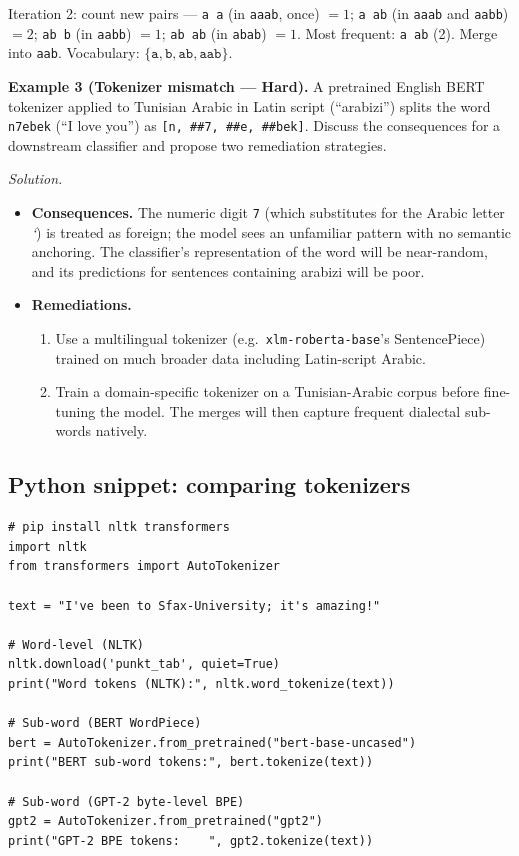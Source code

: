 \documentclass[12pt,a4paper]{report}
\theoremstyle{definition}
\theoremstyle{remark}
\begin{document}
Iteration 2: count new pairs --- \texttt{a\,a} (in \texttt{aaab}, once) $= 1$; \texttt{a\,ab} (in \texttt{aaab} and \texttt{aabb}) $= 2$; \texttt{ab\,b} (in \texttt{aabb}) $= 1$; \texttt{ab\,ab} (in \texttt{abab}) $= 1$.
Most frequent: \texttt{a\,ab} (2). Merge into \texttt{aab}. Vocabulary: $\{\texttt{a}, \texttt{b}, \texttt{ab}, \texttt{aab}\}$.

\medskip

\textbf{Example 3 (Tokenizer mismatch --- Hard).}
A pretrained English BERT tokenizer applied to Tunisian Arabic in Latin script (``arabizi'') splits the word \texttt{n7ebek} (``I love you'') as \texttt{[n, \#\#7, \#\#e, \#\#bek]}. Discuss the consequences for a downstream classifier and propose two remediation strategies.

\textit{Solution.}
\begin{itemize}
    \item \textbf{Consequences.} The numeric digit \texttt{7} (which substitutes for the Arabic letter \emph{`}) is treated as foreign; the model sees an unfamiliar pattern with no semantic anchoring. The classifier's representation of the word will be near-random, and its predictions for sentences containing arabizi will be poor.
    \item \textbf{Remediations.}
    \begin{enumerate}
        \item Use a multilingual tokenizer (e.g.\ \texttt{xlm-roberta-base}'s SentencePiece) trained on much broader data including Latin-script Arabic.
        \item Train a domain-specific tokenizer on a Tunisian-Arabic corpus before fine-tuning the model. The merges will then capture frequent dialectal sub-words natively.
    \end{enumerate}
\end{itemize}

\subsection{Python snippet: comparing tokenizers}

\begin{lstlisting}
# pip install nltk transformers
import nltk
from transformers import AutoTokenizer

text = "I've been to Sfax-University; it's amazing!"

# Word-level (NLTK)
nltk.download('punkt_tab', quiet=True)
print("Word tokens (NLTK):", nltk.word_tokenize(text))

# Sub-word (BERT WordPiece)
bert = AutoTokenizer.from_pretrained("bert-base-uncased")
print("BERT sub-word tokens:", bert.tokenize(text))

# Sub-word (GPT-2 byte-level BPE)
gpt2 = AutoTokenizer.from_pretrained("gpt2")
print("GPT-2 BPE tokens:    ", gpt2.tokenize(text))
\end{lstlisting}
\end{document}
